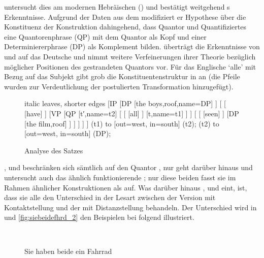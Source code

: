 \citet{shlonsky1991} untersucht dies am modernen Hebräischen () und
bestätigt weitgehend \citeauthor{sportiche1988}s Erkenntnisse. Aufgrund der
Daten aus dem  modifiziert er  Hypothese
über die Konstituenz der Konstruktion dahingehend, dass Quantor und
Quantifiziertes eine Quantorenphrase (QP) mit dem Quantor als Kopf und einer
Determiniererphrase (DP) als Komplement bilden. \citet{merchant1996} überträgt
die Erkenntnisse von \citet{sportiche1988} und \citet{shlonsky1991} auf das
Deutsche und nimmt weitere Verfeinerungen ihrer Theorie
bezüglich möglicher Positionen des gestrandeten Quantors vor. Für das
Englische  `alle' mit Bezug auf das Subjekt gibt
\citet{merchant1996} grob die Konstituentenstruktur in  an
(die Pfeile wurden zur Verdeutlichung der postulierten Transformation
hinzugefügt).

\begin{figure}
	\begin{forest} italic leaves, shorter edges
	[IP
		[DP
			[{the boys},roof,name=DP]
		]
		[
			[
				[have]
			]
			[VP
				[QP
					[t′,name=t2]
					[
						[
							[all]
						]
						[t,name=t1]
					]
				]
				[
					[
						[seen]
					]
					[DP
						[{the film},roof]
					]
				]
			]
		]
	]
	 (t1) to [out=west, in=south] (t2);
	 (t2) to [out=west, in=south] (DP);
	\end{forest}
	\caption{Analyse des Satzes 
	\autocite[nach][180]{merchant1996}}
	\label{fig:qfgg}
\end{figure}

\citet{sportiche1988}, \citet{shlonsky1991} und \citet{merchant1996}
beschränken sich sämtlich auf den Quantor , nur \citet{pittner1995}
geht darüber hinaus und untersucht auch das ähnlich funktionierende ;
nur diese beiden fasst sie im Rahmen ähnlicher Konstruktionen als  auf. Was darüber hinaus \citeauthor{shlonsky1991},
\citeauthor{pittner1995} und \citeauthor{merchant1996} eint, ist, dass sie alle
den Unterschied in der Lesart zwischen der Version mit Kontaktstellung und der
mit Distanzstellung behandeln. Der Unterschied wird in
 und \ref{fig:siebeidefhrd_2} den Beispielen bei
\citet[30--31]{pittner1995} folgend illustriert.

\begin{figure}
\\
\caption{Sie haben beide ein Fahrrad}
\label{fig:siebeidefhrd_1}
\end{figure}

